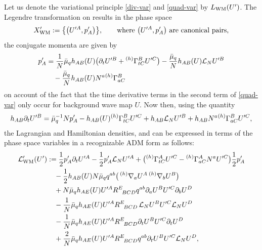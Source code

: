 \documentclass[11pt]{article}
\numberwithin{equation}{section}
\def\q{\quad}%
\def\ptl{\partial}%
\def\mbo#1{\boldsymbol{#1}}%
\def\grad{{\nabla}}%
\newcommand{\leftexp}[2]{{\vphantom{#2}}^{#1}{#2}}
\def\halb{\frac{1}{2}}%
\numberwithin{equation}{section}
\begin{document}
Let us denote the variational principle \eqref{div-var} and \eqref{quad-var} by $L_{{\rm WM}}(U')$. The Legendre transformation on  results in the phase space
\begin{align*}
X'_{{\rm WM}} := \bigl\{ \bigl(U'^{A}, p'_A\bigr) \bigr\}, \qquad \text{where $\bigl(U'^A, p'_A\bigr)$ are canonical pairs,}
\end{align*}
the conjugate momenta \smash{$p'_A = D_{\mbo{\gamma}} \cdot (p_{A} (s)) \vert_{s=0}$} are given by
\begin{align}
p'_A&{}= \frac{1}{N} \bar{\mu}_q h_{AB}(U) \bigl(\ptl_t U'^B + \leftexp{(h)}{\Gamma}^B_{t C} U'^C\bigr) - \frac{\bar{\mu}_q}{N} h_{AB}(U) \mathcal{L}_N U'^B \notag\\
&\quad{}- \frac{\bar{\mu}_q}{N} h_{AB}(U) N^a \leftexp{(h)}{\Gamma}^B_{a C}\label{u-prime-dot-2}
\end{align}
on account of the fact that the time derivative terms in the second term of \eqref{quad-var} only occur for background wave map $U$. Now then, using the quantity
\begin{align*}
h_{AB} \ptl_t U'^B = \bar{\mu}^{-1}_q N p'_A - h_{AB}(U)\leftexp{(h)}{\Gamma}^B_{tC} U'^C + h_{AB} \mathcal{L}_N U'^B + h_{AB} N^a \leftexp{(h)}{\Gamma}^B_{a C} U'^C,
\end{align*}
the Lagrangian and Hamiltonian densities,  and  can be expressed in terms of the phase space variables  in a recognizable ADM form as follows:
\begin{align*}
\mathcal{L}'_{{\rm WM}} (U') &:=
\halb p'_A \ptl_t U'^A - \halb p'_A \mathcal{L}_N U'^A + \bigl(\leftexp{(h)}{\Gamma}^A_{tC} U'^C - \leftexp{(h)}{\Gamma}^A_{a C} N^a U'^C \bigr)\halb p'_A \notag\\
&\quad{}-\halb h_{AB}(U) N \bar{\mu}_q q^{ab} \bigl(\,\leftexp{(h)}{\grad}_a U^A \, \leftexp{(h)}{\grad}_b U^B \bigr) \notag\\
&\quad{}+ N \bar{\mu}_q h_{AE}(U) U'^A R^E_{\,\,\,\,BCD} q^{a b} \ptl_a U^B U'^C \ptl_b U^D \notag\\
&\quad{} -\frac{1}{N} \bar{\mu}_q h_{AE}(U) U'^A R^E_{\,\,\,\,BCD} \, \mathcal{L}_N U^B U'^C \mathcal{L}_N U^D \notag\\
&\quad{}- \frac{1}{N} \bar{\mu}_q h_{AE}(U) U'^A R^E_{\,\,\,\,BCD} \ptl_t U^B U'^C \ptl_t U^D \notag\\
&\q{} + \frac{2}{N}\bar{\mu}_q h_{AE}(U) U'^A R^E_{\,\,\,\,BCD} q^{a b} \ptl_t U^B U'^C \mathcal{L}_N U^D,
\end{align*}
\end{document}
